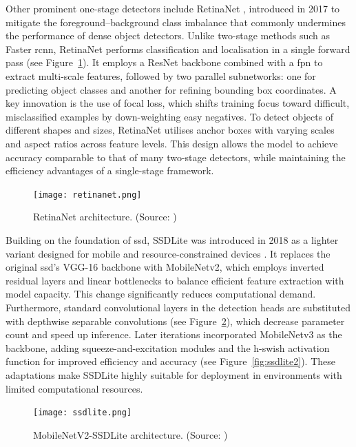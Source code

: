 Other prominent one-stage detectors include RetinaNet \cite{retinanet}, introduced in 2017 to mitigate the foreground–background class imbalance that commonly undermines the performance of dense object detectors. Unlike two-stage methods such as Faster \gls{rcnn}, RetinaNet performs classification and localisation in a single forward pass (see Figure~\ref{fig:retinanet}). It employs a ResNet backbone combined with a \gls{fpn} to extract multi-scale features, followed by two parallel subnetworks: one for predicting object classes and another for refining bounding box coordinates. A key innovation is the use of focal loss, which shifts training focus toward difficult, misclassified examples by down-weighting easy negatives. To detect objects of different shapes and sizes, RetinaNet utilises anchor boxes with varying scales and aspect ratios across feature levels. This design allows the model to achieve accuracy comparable to that of many two-stage detectors, while maintaining the efficiency advantages of a single-stage framework.

\begin{figure}[!htbp]
\centering
\texttt{[image: retinanet.png]}
\caption{RetinaNet architecture. (Source: \cite{retinanet})}
\label{fig:retinanet}
\end{figure}


Building on the foundation of \gls{ssd}, SSDLite was introduced in 2018 as a lighter variant designed for mobile and resource-constrained devices \cite{ssdlite}. It replaces the original \gls{ssd}'s VGG-16 backbone with MobileNetv2, which employs inverted residual layers and linear bottlenecks to balance efficient feature extraction with model capacity. This change significantly reduces computational demand. Furthermore, standard convolutional layers in the detection heads are substituted with depthwise separable convolutions (see Figure~\ref{fig:ssdlite}), which decrease parameter count and speed up inference. Later iterations incorporated MobileNetv3 as the backbone, adding squeeze-and-excitation modules and the h-swish activation function for improved efficiency and accuracy (see Figure~\ref{fig:ssdlite2}). These adaptations make SSDLite highly suitable for deployment in environments with limited computational resources.

\begin{figure}[!htbp]
\centering
\texttt{[image: ssdlite.png]}
\caption{MobileNetV2-SSDLite architecture. (Source: \cite{ssdlite_diagram})}
\label{fig:ssdlite}
\end{figure}

